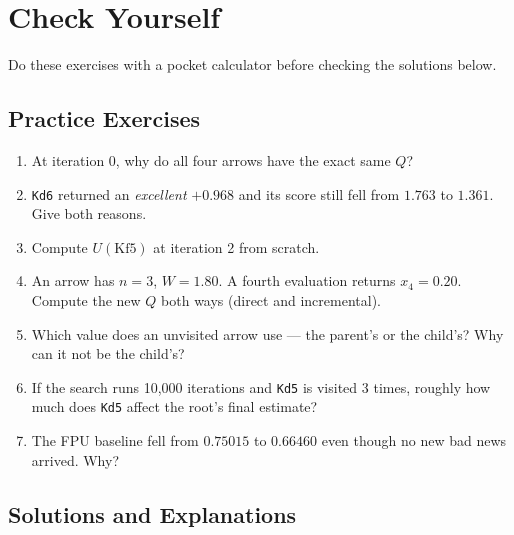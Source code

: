 \chapter{Check Yourself}
\label{ch:check_yourself}

Do these exercises with a pocket calculator before checking the solutions below.

\section{Practice Exercises}

\begin{enumerate}[leftmargin=2em]
  \item At iteration 0, why do all four arrows have the exact same $Q$?
  \item \texttt{Kd6} returned an \textit{excellent} $+0.968$ and its score still fell from $1.763$ to $1.361$. Give both reasons.
  \item Compute $U(\text{Kf5})$ at iteration 2 from scratch.
  \item An arrow has $n = 3$, $W = 1.80$. A fourth evaluation returns $x_4 = 0.20$. Compute the new $Q$ both ways (direct and incremental).
  \item Which value does an unvisited arrow use --- the parent's or the child's? Why can it not be the child's?
  \item If the search runs 10,000 iterations and \texttt{Kd5} is visited 3 times, roughly how much does \texttt{Kd5} affect the root's final estimate?
  \item The FPU baseline fell from $0.75015$ to $0.66460$ even though no new bad news arrived. Why?
\end{enumerate}

\section{Solutions and Explanations}

